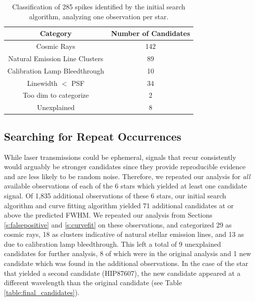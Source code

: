 \documentclass[linenumbers]{aastex631}
\begin{document}
\begin{table}
\begin{center}
\begin{tabular}{|c|c|} 
 \hline
 Category & Number of Candidates \\ 
 \hline
 Cosmic Rays & 142 \\ 
 Natural Emission Line Clusters & 89 \\ 
 Calibration Lamp Bleedthrough &  10 \\ 
 Linewidth $<$ PSF & 34 \\
 Too dim to categorize & 2 \\
 Unexplained & 8 \\
 \hline
 \end{tabular}
\end{center}
\caption{Classification of 285 spikes identified by the initial search algorithm, analyzing one observation per star.}
\label{table:classification}
\end{table}

\subsection{Searching for Repeat Occurrences}
\label{s:repeat}
While laser transmissions could be ephemeral, signals that recur consistently would arguably be stronger candidates since they provide reproducible evidence and are less likely to be random noise.  Therefore, we repeated our analysis for {\em all} available observations of each of the 6 stars which yielded at least one candidate signal. Of 1,835 additional observations of these 6 stars, our initial search algorithm and curve fitting algorithm yielded 71 additional candidates at or above the predicted FWHM. We repeated our analysis from Sections \ref{s:falsepositive} and \ref{s:curvefit} on these observations, and categorized 29 as cosmic rays, 18 as clusters indicative of natural stellar emission lines, and 13 as due to calibration lamp bleedthrough. This left a total of 9 unexplained candidates for further analysis, 8 of which were in the original analysis and 1 new candidate which was found in the additional observations. In the case of the star that yielded a second candidate (HIP87607), the new candidate appeared at a different wavelength than the original candidate (see Table \ref{table:final_candidates}).
\end{document}
